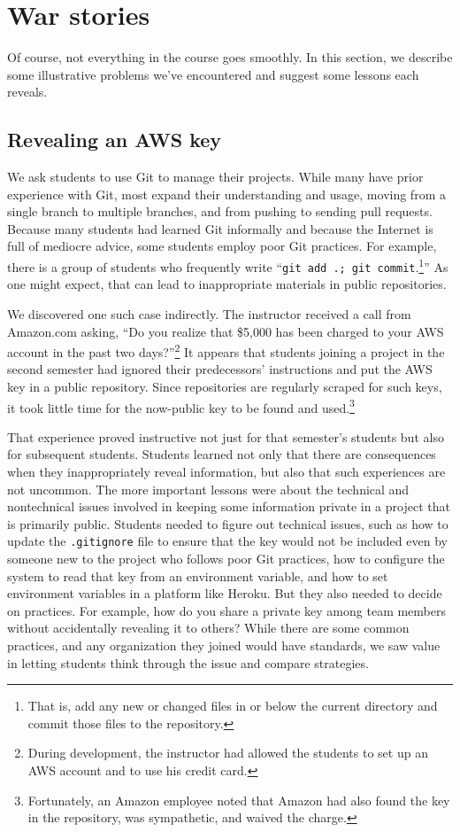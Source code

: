 \section{War stories}

Of course, not everything in the course goes smoothly.  In this section,
we describe some illustrative problems we've encountered and suggest
some lessons each reveals. 

\subsection{Revealing an AWS key}

We ask students to use Git to manage their projects.  While many
have prior experience with Git, most expand
their understanding and usage, moving
from a single branch to multiple branches, and from pushing
to sending pull requests.  Because many students had learned Git
informally and because the Internet is full of mediocre advice,
some students employ poor Git practices.  For example, there is a
group of students who frequently write ``\texttt{git add .; git
commit}.\footnote{That is, add any new or changed files in or below
the current directory and commit those files to the repository.}''
As one might expect, that can lead to inappropriate materials in
public repositories.

We discovered one such case indirectly.  The instructor received
a call from Amazon.com asking, ``Do you realize that \$5,000 has
been charged to your AWS account in the past two days?''\footnote{During
development, the instructor had allowed the students to set up an
AWS account and to use his credit card.}  It appears that students
joining a project in the second semester had ignored their predecessors'
instructions and put the AWS key in a public repository.  Since
repositories are regularly scraped for such
keys, it took little time for the now-public key to be found and
used.\footnote{Fortunately, an Amazon employee noted that Amazon
had also found the key in the repository, was sympathetic, and
waived the charge.}

That experience proved instructive not just for that semester's
students but also for subsequent students.  Students learned not
only that there are consequences when they inappropriately reveal
information, but also that such experiences are not uncommon.  The
more important lessons were about the technical and nontechnical
issues involved in keeping some information private in a project
that is primarily public.  Students needed to figure out technical
issues, such as how to update the \texttt{.gitignore} file to ensure
that the key would not be included even by someone new to the
project who follows poor Git practices, how to configure the system to read
that key from an environment variable, and how to set environment
variables in a platform like Heroku.  But they also needed to decide
on practices.  For example, how do you share a private key among
team members without accidentally revealing it to others?  While
there are some common practices, and any organization they joined
would have standards, we saw value in letting students think through
the issue and compare strategies.

